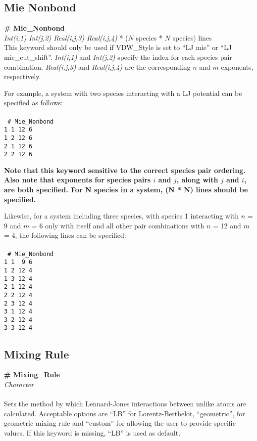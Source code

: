 \subsection{Mie Nonbond}\label{sec:Mie_Nonbond}
{\bf \# Mie\_Nonbond} \\
{\it Int(i,1) Int(j,2) Real(i,j,3) Real(i,j,4)} * ($N$ species * $N$ species) lines \\ 

This keyword should only be used if VDW\_Style is set to ``LJ mie'' or ``LJ mie\_cut\_shift''.
\textit{Int(i,1)} and \textit{Int(j,2)} specify the index for each species pair combination.  \textit{Real(i,j,3)} and \textit{Real(i,j,4)} are the corresponding $n$ and $m$ exponents, respectively. 

For example, a system with two species interacting with a LJ potential can be specified as follows:\\ \\
\texttt{
\# Mie\_Nonbond \\
1 1 12 6 \\
1 2 12 6 \\
2 1 12 6 \\
2 2 12 6
}

\textbf{Note that this keyword sensitive to the correct species pair ordering. Also note that exponents for species pairs $i$ and $j$, along with $j$ and $i$, are both specified. For N species in a system, (N * N) lines should be specified.}


Likewise, for a system including three species, with species 1 interacting with $n$ = 9 and $m$ = 6 only with itself and all other pair combinations with $n$ = 12 and $m$ = 4, the following lines can be specified: \\ \\
\texttt{
\# Mie\_Nonbond \\
1 1 \ 9 6 \\
1 2 12 4 \\
1 3 12 4 \\
2 1 12 4 \\
2 2 12 4 \\
2 3 12 4 \\
3 1 12 4 \\
3 2 12 4 \\
3 3 12 4
}
%
%
%
\subsection{Mixing Rule}\label{Mixing_Rule}
{\bf \# Mixing\_Rule} \\
{\it Character} \\ \\
%
Sets the method by which Lennard-Jones interactions between unlike atoms are
calculated. Acceptable options are ``LB''  for Lorentz-Berthelot,
``geometric'', for geometric mixing rule and ``custom'' for allowing the user to provide specific values. 
If this keyword is missing, ``LB'' is used as default. \\

